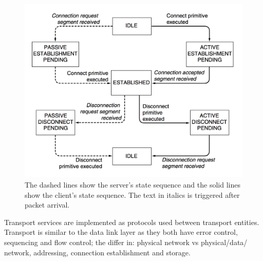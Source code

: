 \documentclass[twoside]{article}
\begin{document}
\begin{figure}
  \includegraphics[width=\linewidth]{connection-state.png}
  \caption{The dashed lines show the server's state sequence and the solid lines
  show the client's state sequence. The text in italics is triggered after 
  packet arrival.}
  \label{fig:connection-state}
\end{figure}
Transport services are implemented as protocols used between transport entities.
Transport is similar to the data link layer as they both have error control,
sequencing and flow control; the differ in: physical network vs physical/data/
network, addressing, connection establishment and storage. \\
\end{document}
